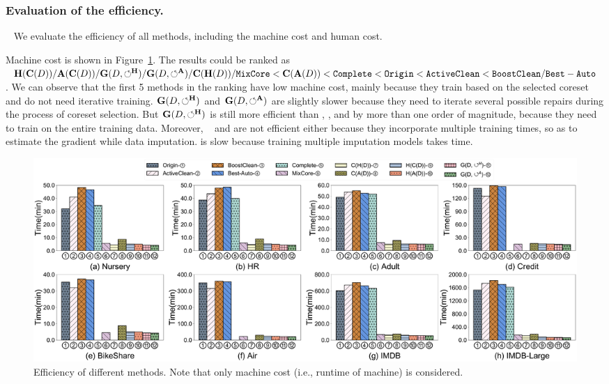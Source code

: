  



\subsubsection{Evaluation of the efficiency.}~\label{sec:exp:efficiency} We  evaluate the efficiency of all methods, including the machine cost and human cost.

 Machine cost is shown  in Figure~\ref{fig:efficiency_old}.  The results could be ranked as $\mathbf{H}(\mathbf{C}(D))/\mathbf{A}(\mathbf{C}(D))/\mathbf{G}(D,\circlearrowleft^\mathbf{H})/\mathbf{G}(D,\circlearrowleft^\mathbf{A})/\mathbf{C}(\mathbf{H}(D))/{\tt MixCore} < \mathbf{C}(\mathbf{A}(D)) < {\tt Complete} < {\tt Origin} < {\tt ActiveClean} < {\tt BoostClean} /{\tt Best-Auto} $. We can observe that the first 5 methods in the ranking have low machine cost, mainly because they train based on the selected coreset and do not need iterative training. $\mathbf{G}(D,\circlearrowleft^\mathbf{H})$ and  $\mathbf{G}(D,\circlearrowleft^\mathbf{A})$ are slightly slower  because they need to iterate several possible repairs during the process of coreset selection.  But $\mathbf{G}(D,\circlearrowleft^\mathbf{H})$ is still more efficient than \noclean, \truth, \boostclean and \gain by more than one order of magnitude,  because they need to train on the entire training data. 
 Moreover, \actclean~  and \boostclean are  not efficient either because they incorporate multiple training times, so as to estimate the gradient while data imputation. \gain is slow because training multiple imputation models takes time.
 \begin{figure}
	\centering
	\includegraphics[width=\textwidth]{figs/efficiency_old}
	\vspace{-2.5em}
	\caption{Efficiency of different methods. Note that only machine cost (i.e., runtime of machine) is considered.}
	\label{fig:efficiency_old}
	\vspace*{-1.5em}
\end{figure}

